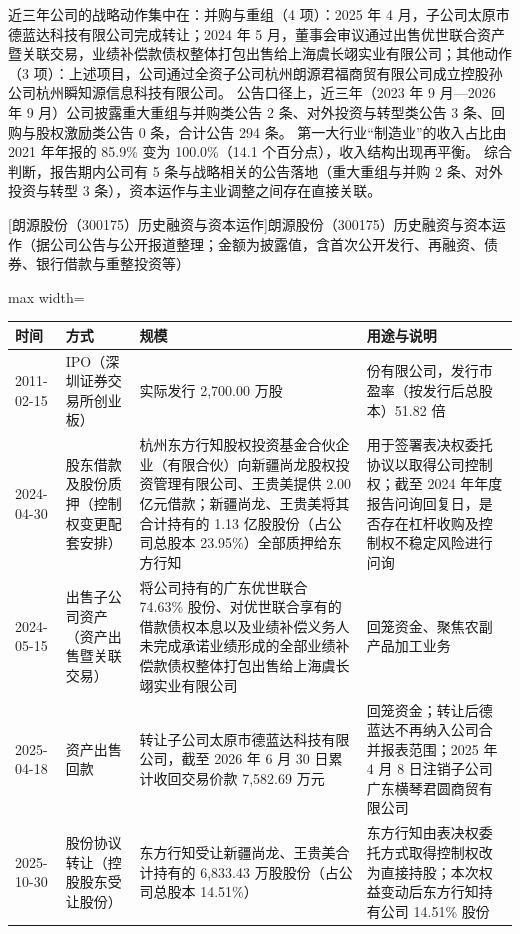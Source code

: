  近三年公司的战略动作集中在：并购与重组（4 项）：2025 年 4 月，子公司太原市德蓝达科技有限公司完成转让；2024 年 5 月，董事会审议通过出售优世联合资产暨关联交易，业绩补偿款债权整体打包出售给上海虞长翊实业有限公司；其他动作（3 项）：上述项目，公司通过全资子公司杭州朗源君福商贸有限公司成立控股孙公司杭州瞬知源信息科技有限公司。 公告口径上，近三年（2023 年 9 月---2026 年 9 月）公司披露重大重组与并购类公告 2 条、对外投资与转型类公告 3 条、回购与股权激励类公告 0 条，合计公告 294 条。 第一大行业“制造业”的收入占比由 2021 年年报的 85.9\% 变为 100.0\%（14.1 个百分点），收入结构出现再平衡。 综合判断，报告期内公司有 5 条与战略相关的公告落地（重大重组与并购 2 条、对外投资与转型 3 条），资本运作与主业调整之间存在直接关联。

\begin{center}\small\setlength{\tabcolsep}{4pt}
[朗源股份（300175）历史融资与资本运作]{朗源股份（300175）历史融资与资本运作（据公司公告与公开报道整理；金额为披露值，含首次公开发行、再融资、债券、银行借款与重整投资等）}
\begin{adjustbox}{max width=\textwidth}
\begin{tabular}{@{}p{1.45cm}p{2.55cm}p{4.05cm}p{4.95cm}@{}}
\toprule
时间 & 方式 & 规模 & 用途与说明 \\
\midrule
2011-02-15 & IPO（深圳证券交易所创业板） & 实际发行 2,\allowbreak{}700.00 万股 & 份有限公司，\allowbreak{}发行市盈率（按发行后总股本）51.82 倍 \\
2024-04-30 & 股东借款及股份质押（控制权变更配套安排） & 杭州东方行知股权投资基金合伙企业（有限合伙）向新疆尚龙股权投资管理有限公司、\allowbreak{}王贵美提供 2.00 亿元借款；新疆尚龙、\allowbreak{}王贵美将其合计持有的 1.13 亿股股份（占公司总股本 23.95\%）全部质押给东方行知 & 用于签署表决权委托协议以取得公司控制权；截至 2024 年年度报告问询回复日，\allowbreak{}是否存在杠杆收购及控制权不稳定风险进行问询 \\
2024-05-15 & 出售子公司资产（资产出售暨关联交易） & 将公司持有的广东优世联合 74.63\% 股份、\allowbreak{}对优世联合享有的借款债权本息以及业绩补偿义务人未完成承诺业绩形成的全部业绩补偿款债权整体打包出售给上海虞长翊实业有限公司 & 回笼资金、\allowbreak{}聚焦农副产品加工业务 \\
2025-04-18 & 资产出售回款 & 转让子公司太原市德蓝达科技有限公司，\allowbreak{}截至 2026 年 6 月 30 日累计收回交易价款 7,\allowbreak{}582.69 万元 & 回笼资金；转让后德蓝达不再纳入公司合并报表范围；2025 年 4 月 8 日注销子公司广东横琴君圆商贸有限公司 \\
2025-10-30 & 股份协议转让（控股股东受让股份） & 东方行知受让新疆尚龙、\allowbreak{}王贵美合计持有的 6,\allowbreak{}833.43 万股股份（占公司总股本 14.51\%） & 东方行知由表决权委托方式取得控制权改为直接持股；本次权益变动后东方行知持有公司 14.51\% 股份 \\

\end{tabular}
\end{adjustbox}
\end{center}
